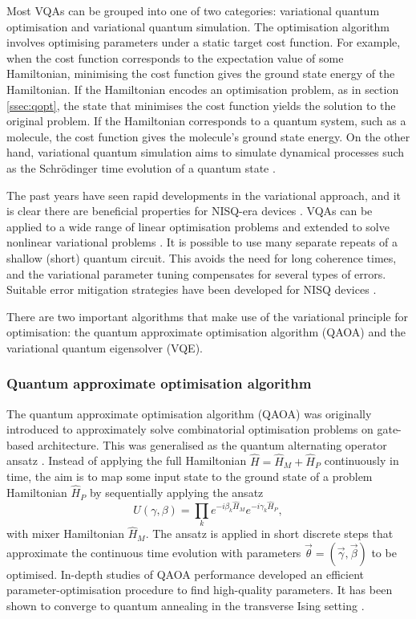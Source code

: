 \documentclass[10pt]{iopart}
\begin{document}
Most VQAs can be grouped into one of two categories: variational quantum optimisation and variational quantum simulation. The optimisation algorithm involves optimising parameters under a static target cost function. For example, when the cost function corresponds to the expectation value of some Hamiltonian, minimising the cost function gives the ground state energy of the Hamiltonian. If the Hamiltonian encodes an optimisation problem, as in section  \ref{ssec:qopt}, the state that minimises the cost function yields the solution to the original problem. If the Hamiltonian corresponds to a quantum system, such as a molecule, the cost function gives the molecule's ground state energy. On the other hand, variational quantum simulation aims to simulate dynamical processes such as the Schr{\"o}dinger time evolution of a quantum state \cite{Yuan2019}. 

The past years have seen rapid developments in the variational approach, and it is clear there are beneficial properties for NISQ-era devices \cite{Cerezo2021}. VQAs can be applied to a wide range of linear optimisation problems and extended to solve nonlinear variational problems \cite{Lubasch2020}. It is possible to use many separate repeats of a shallow (short) quantum circuit. This avoids the need for long coherence times, and the variational parameter tuning compensates for several types of errors. Suitable error mitigation strategies have been developed for NISQ devices \cite{Botelho2022,Ravi2022}. 

There are two important algorithms that make use of the variational principle for optimisation: the quantum approximate optimisation algorithm (QAOA) and the variational quantum eigensolver (VQE). 


\subsubsection{Quantum approximate optimisation algorithm}\label{sssec:QAOA}\hfill

The quantum approximate optimisation algorithm (QAOA) was originally introduced to approximately solve combinatorial optimisation problems \cite{Farhi2014} on gate-based architecture. This was generalised as the quantum alternating operator ansatz \cite{Hadfield2019}.  Instead of applying the full Hamiltonian $\hat{H} = \hat{H}_M + \hat{H}_P$ continuously in time, the aim is to map some input state to the ground state of a problem Hamiltonian $\hat{H}_P$ by sequentially applying the ansatz
\begin{equation}
U(\gamma,\beta) = \prod_k e^{-i\beta_k\hat{H}_M} e^{-i\gamma_k\hat{H}_P},
\end{equation}
with mixer Hamiltonian $\hat{H}_M$. The ansatz is applied in short discrete steps that approximate the continuous time evolution with parameters $\vec{\theta}=(\vec{\gamma},\vec{\beta})$ to be optimised. In-depth studies of QAOA performance \cite{Zhou2020,Wang2020} developed an efficient parameter-optimisation procedure to find high-quality parameters. It has been shown to converge to quantum annealing in the transverse Ising setting \cite{Brady2021}.  
\end{document}
